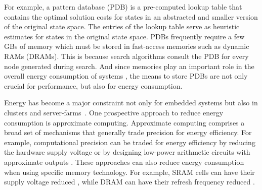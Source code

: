 \documentclass[letterpaper]{article}
\begin{document}
For example, a pattern database (PDB) is a pre-computed lookup table that contains the optimal solution costs for states in an abstracted and smaller version of the original state space. The entries of the lookup table serve as heuristic estimates for states in the original state space. 
PDBs frequently require a few GBs of memory which must be stored in fast-access memories such as dynamic RAMs (DRAMs). This is because search algorithms consult the PDB for every node generated during search. And since memories play an important role in the overall energy consumption of systems \cite{5695550}, the means to store PDBs are not only crucial for performance, but also for energy consumption.

Energy has become a major constraint not only for embedded systems but also in clusters and server-farms~\cite{Cameron2005}. One prospective approach to reduce energy consumption is approximate computing. Approximate computing comprises a broad set of mechanisms that generally trade precision for energy efficiency. For example, computational precision can be traded for energy efficiency by reducing the hardware supply voltage 
\cite{974895} or by designing low-power arithmetic circuits with approximate outputs \cite{5993675}. These approaches can also reduce energy consumption when using specific memory technology. For example, SRAM cells can have their supply voltage reduced \cite{5686921}, while DRAM can have their refresh frequency reduced \cite{Liu:2011:FSD:1950365.1950391}. %
\end{document}
